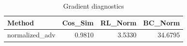 \begin{table}[htbp]
\centering
\caption{Gradient diagnostics}
\label{tab:grad-diag}
\begin{tabular}{lrrr}
\toprule
\textbf{Method} & \textbf{Cos\_Sim} & \textbf{RL\_Norm} & \textbf{BC\_Norm} \\
\midrule
normalized\_adv & 0.9810 & 3.5330 & 34.6795 \\
\bottomrule
\end{tabular}
\end{table}